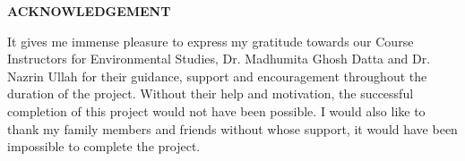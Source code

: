 \begin{titlepage}
    \begin{center}
        \textbf{{\Huge ACKNOWLEDGEMENT}}
    \end{center}
    \noindent
{\Large It  gives  me  immense  pleasure  to  express  my  gratitude  towards  our 
Course  Instructors  for  Environmental  Studies,  Dr.  Madhumita  Ghosh Datta and Dr. Nazrin Ullah  for  their  guidance,  support  and  encouragement  throughout  the 
duration of the project. Without their help and motivation, the 
successful  completion  of  this  project  would  not  have  been  possible. I
would also like to thank my family members and friends without whose support, it 
would have been impossible to complete the project.}
\end{titlepage}